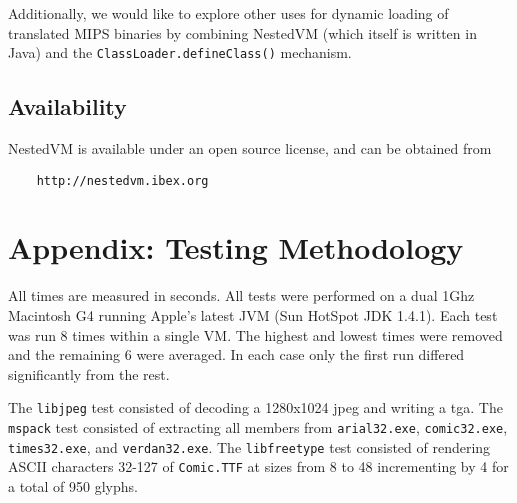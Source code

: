 \documentclass{acmconf}
\begin{document}
Additionally, we would like to explore other uses for dynamic loading
of translated MIPS binaries by combining NestedVM (which itself is
written in Java) and the {\tt ClassLoader.defineClass()} mechanism.

\subsection{Availability}

NestedVM is available under an open source license, and can be
obtained from
\begin{verbatim}
    http://nestedvm.ibex.org
\end{verbatim}

\appendix
\section{Appendix: Testing Methodology}

All times are measured in seconds.  All tests were performed on a dual
1Ghz Macintosh G4 running Apple's latest JVM (Sun HotSpot JDK
1.4.1). Each test was run 8 times within a single VM. The highest and
lowest times were removed and the remaining 6 were averaged.  In each
case only the first run differed significantly from the rest.

The {\tt libjpeg} test consisted of decoding a 1280x1024 jpeg and
writing a tga.  The {\tt mspack} test consisted of extracting all
members from {\tt arial32.exe}, {\tt comic32.exe}, {\tt times32.exe},
and {\tt verdan32.exe}. The {\tt libfreetype} test consisted of
rendering ASCII characters 32-127 of {\tt Comic.TTF} at sizes from 8
to 48 incrementing by 4 for a total of 950 glyphs.


\end{document}
